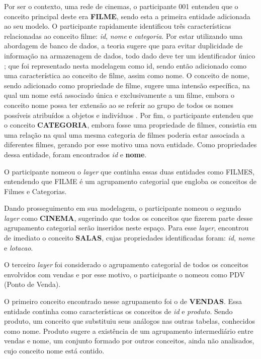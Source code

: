 Por ser o contexto, uma rede de cinemas, o participante 001 entendeu que o conceito principal deste era \textbf{FILME}, sendo esta a primeira entidade adicionada ao seu modelo. O participante rapidamente identificou três características relacionadas ao conceito filme: \textit{id}, \textit{nome} e \textit{categoria}. Por estar utilizando uma abordagem de banco de dados, a teoria sugere que para evitar duplicidade de informação na armazenagem de dados, todo dado deve ter um identificador único \citep{heuser:2001.projeto, machado:2009.projeto}; que foi representado nesta modelagem como id, sendo então adicionado como uma característica ao conceito de filme, assim como nome. O conceito de nome, sendo adicionado como propriedade de filme, sugere uma intensão específica, na qual um nome está associado única e exclusivamente a um filme, embora o conceito nome possa ter extensão ao se referir ao grupo de todos os nomes possíveis atribuídos a objetos e indivíduos \citep{dahlberg:1978.fundamentos}. Por fim, o participante entendeu que o conceito \textbf{CATEGORIA}, embora fosse uma propriedade de filmes, consistia em uma relação na qual uma mesma categoria de filmes poderia estar associada a diferentes filmes, gerando por esse motivo uma nova entidade. Como propriedades dessa entidade, foram encontrados \textit{id} e \textbf{nome}.

O participante nomeou o \textit{layer} que continha essas duas entidades como FILMES, entendendo que FILME é um agrupamento categorial que engloba os conceitos de Filmes e Categorias.
 
Dando prosseguimento em sua modelagem, o participante nomeou o segundo \textit{layer} como \textbf{CINEMA}, sugerindo que todos os conceitos que fizerem parte desse agrupamento categorial serão inseridos neste espaço. Para esse \textit{layer}, encontrou de imediato o conceito \textbf{SALAS}, cujas propriedades identificadas foram: \textit{id}, \textit{nome} e \textit{lotacao}.

O terceiro \textit{layer} foi considerado o agrupamento categorial de todos os conceitos envolvidos com vendas e por esse motivo, o participante o nomeou como PDV (Ponto de Venda). 

O primeiro conceito encontrado nesse agrupamento foi o de \textbf{VENDAS}. Essa entidade continha como características os conceitos de \textit{id} e \textit{produto}. Sendo produto, um conceito que substituiu seus análogos nas outras tabelas, conhecidos como nome. Produto sugere a existência de um agrupamento intermediário entre vendas e nome, um conjunto formado por outros conceitos, ainda não analisados, cujo conceito nome está contido.

